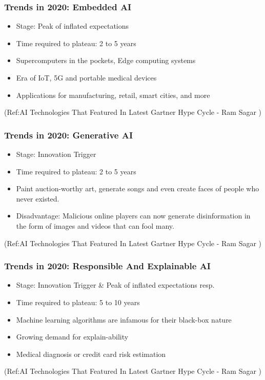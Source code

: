 \begin{frame}[fragile]\frametitle{Trends in 2020: Embedded AI}
\begin{itemize}
\item Stage: Peak of inflated expectations
\item Time required to plateau: 2 to 5 years
\item Supercomputers in the pockets, Edge computing systems
\item Era of IoT, 5G and portable medical devices
\item Applications for manufacturing, retail, smart cities, and more
\end{itemize}


{\tiny (Ref:AI Technologies That Featured In Latest Gartner Hype Cycle - 
Ram Sagar )}

\end{frame}

\begin{frame}[fragile]\frametitle{Trends in 2020: Generative AI}
\begin{itemize}
\item Stage: Innovation Trigger
\item Time required to plateau: 2 to 5 years
\item Paint auction-worthy art, generate songs and even create faces of people who never existed. 
\item Disadvantage: Malicious online players can now generate disinformation in the form of images and videos that can fool many. 
\end{itemize}


{\tiny (Ref:AI Technologies That Featured In Latest Gartner Hype Cycle - 
Ram Sagar )}

\end{frame}

\begin{frame}[fragile]\frametitle{Trends in 2020: Responsible And Explainable AI}
\begin{itemize}
\item Stage: Innovation Trigger \& Peak of inflated expectations resp.
\item Time required to plateau: 5 to 10 years
\item Machine learning algorithms are infamous for their black-box nature
\item Growing demand for explain-ability
\item Medical diagnosis or credit card risk estimation
\end{itemize}


{\tiny (Ref:AI Technologies That Featured In Latest Gartner Hype Cycle - 
Ram Sagar )}

\end{frame}

